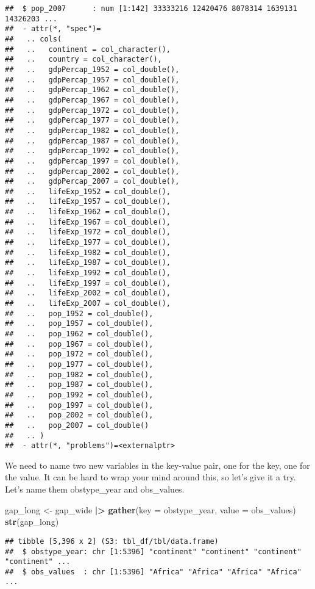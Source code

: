\documentclass[
]{article}
\newenvironment{Shaded}{\begin{snugshade}}{\end{snugshade}}
\newcommand{\AttributeTok}[1]{\textcolor[rgb]{0.13,0.29,0.53}{#1}}
\newcommand{\FunctionTok}[1]{\textcolor[rgb]{0.13,0.29,0.53}{\textbf{#1}}}
\newcommand{\NormalTok}[1]{#1}
\newcommand{\OtherTok}[1]{\textcolor[rgb]{0.56,0.35,0.01}{#1}}
\newcommand{\SpecialCharTok}[1]{\textcolor[rgb]{0.81,0.36,0.00}{\textbf{#1}}}
\begin{document}
\begin{verbatim}
##  $ pop_2007      : num [1:142] 33333216 12420476 8078314 1639131 14326203 ...
##  - attr(*, "spec")=
##   .. cols(
##   ..   continent = col_character(),
##   ..   country = col_character(),
##   ..   gdpPercap_1952 = col_double(),
##   ..   gdpPercap_1957 = col_double(),
##   ..   gdpPercap_1962 = col_double(),
##   ..   gdpPercap_1967 = col_double(),
##   ..   gdpPercap_1972 = col_double(),
##   ..   gdpPercap_1977 = col_double(),
##   ..   gdpPercap_1982 = col_double(),
##   ..   gdpPercap_1987 = col_double(),
##   ..   gdpPercap_1992 = col_double(),
##   ..   gdpPercap_1997 = col_double(),
##   ..   gdpPercap_2002 = col_double(),
##   ..   gdpPercap_2007 = col_double(),
##   ..   lifeExp_1952 = col_double(),
##   ..   lifeExp_1957 = col_double(),
##   ..   lifeExp_1962 = col_double(),
##   ..   lifeExp_1967 = col_double(),
##   ..   lifeExp_1972 = col_double(),
##   ..   lifeExp_1977 = col_double(),
##   ..   lifeExp_1982 = col_double(),
##   ..   lifeExp_1987 = col_double(),
##   ..   lifeExp_1992 = col_double(),
##   ..   lifeExp_1997 = col_double(),
##   ..   lifeExp_2002 = col_double(),
##   ..   lifeExp_2007 = col_double(),
##   ..   pop_1952 = col_double(),
##   ..   pop_1957 = col_double(),
##   ..   pop_1962 = col_double(),
##   ..   pop_1967 = col_double(),
##   ..   pop_1972 = col_double(),
##   ..   pop_1977 = col_double(),
##   ..   pop_1982 = col_double(),
##   ..   pop_1987 = col_double(),
##   ..   pop_1992 = col_double(),
##   ..   pop_1997 = col_double(),
##   ..   pop_2002 = col_double(),
##   ..   pop_2007 = col_double()
##   .. )
##  - attr(*, "problems")=<externalptr>
\end{verbatim}

We need to name two new variables in the key-value pair, one for the
key, one for the value. It can be hard to wrap your mind around this, so
let's give it a try. Let's name them obstype\_year and obs\_values.

\begin{Shaded}
\begin{Highlighting}[]
\NormalTok{gap\_long }\OtherTok{\textless{}{-}}\NormalTok{ gap\_wide }\SpecialCharTok{|\textgreater{}}
 \FunctionTok{gather}\NormalTok{(}\AttributeTok{key =}\NormalTok{ obstype\_year,}
  \AttributeTok{value =}\NormalTok{ obs\_values)}
\FunctionTok{str}\NormalTok{(gap\_long)}
\end{Highlighting}
\end{Shaded}

\begin{verbatim}
## tibble [5,396 x 2] (S3: tbl_df/tbl/data.frame)
##  $ obstype_year: chr [1:5396] "continent" "continent" "continent" "continent" ...
##  $ obs_values  : chr [1:5396] "Africa" "Africa" "Africa" "Africa" ...
\end{verbatim}
\end{document}

